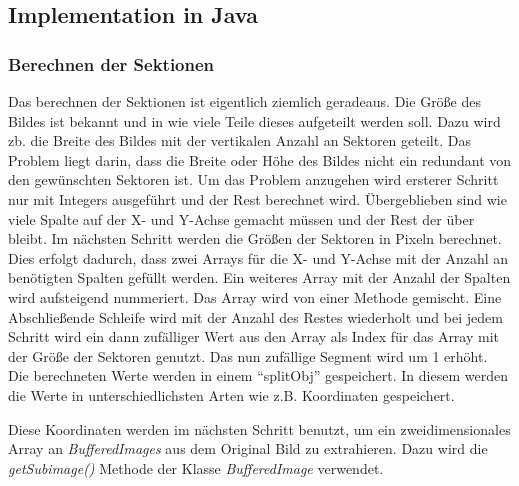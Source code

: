 \subsection{Implementation in Java}
\subsubsection{Berechnen der Sektionen}
Das berechnen der Sektionen ist eigentlich ziemlich geradeaus. Die Größe des Bildes ist bekannt und in wie viele Teile dieses aufgeteilt werden soll. Dazu wird zb. die Breite des Bildes mit der vertikalen Anzahl an Sektoren geteilt. Das Problem liegt darin, dass die Breite oder Höhe des Bildes nicht ein redundant von den gewünschten Sektoren ist. Um das Problem anzugehen wird ersterer Schritt nur mit Integers ausgeführt und der Rest berechnet wird. Übergeblieben sind wie viele Spalte auf der X- und Y-Achse gemacht müssen und der Rest der über bleibt. Im nächsten Schritt werden die Größen der Sektoren in Pixeln berechnet. Dies erfolgt dadurch, dass zwei Arrays für die X- und Y-Achse mit der Anzahl an benötigten Spalten gefüllt werden. Ein weiteres Array mit der Anzahl der Spalten wird aufsteigend nummeriert. Das Array wird von einer Methode gemischt. Eine Abschließende Schleife wird mit der Anzahl des Restes wiederholt und bei jedem Schritt wird ein dann zufälliger Wert aus den Array als Index für das Array mit der Größe der Sektoren genutzt. Das nun zufällige Segment wird um 1 erhöht. Die berechneten Werte werden in einem ``splitObj'' gespeichert. In diesem werden die Werte in unterschiedlichsten Arten wie z.B. Koordinaten gespeichert. 

Diese Koordinaten werden im nächsten Schritt benutzt, um ein zweidimensionales Array an \textit{BufferedImages} aus dem Original Bild zu extrahieren. Dazu wird die \textit{getSubimage()} Methode der Klasse \textit{BufferedImage} verwendet.

